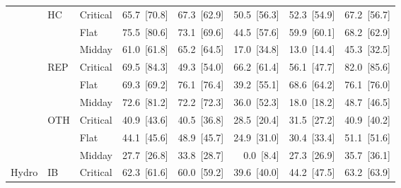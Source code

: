 \begin{tabular}{l l l r r r r r}
 & HC & Critical & 65.7~{\color{seasoncol}\scriptsize[70.8]} & 67.3~{\color{seasoncol}\scriptsize[62.9]} & 50.5~{\color{seasoncol}\scriptsize[56.3]} & 52.3~{\color{seasoncol}\scriptsize[54.9]} & 67.2~{\color{seasoncol}\scriptsize[56.7]} \\
 &  & Flat & 75.5~{\color{seasoncol}\scriptsize[80.6]} & 73.1~{\color{seasoncol}\scriptsize[69.6]} & 44.5~{\color{seasoncol}\scriptsize[57.6]} & 59.9~{\color{seasoncol}\scriptsize[60.1]} & 68.2~{\color{seasoncol}\scriptsize[62.9]} \\
 &  & Midday & 61.0~{\color{seasoncol}\scriptsize[61.8]} & 65.2~{\color{seasoncol}\scriptsize[64.5]} & 17.0~{\color{seasoncol}\scriptsize[34.8]} & 13.0~{\color{seasoncol}\scriptsize[14.4]} & 45.3~{\color{seasoncol}\scriptsize[32.5]} \\
 & REP & Critical & 69.5~{\color{seasoncol}\scriptsize[84.3]} & 49.3~{\color{seasoncol}\scriptsize[54.0]} & 66.2~{\color{seasoncol}\scriptsize[61.4]} & 56.1~{\color{seasoncol}\scriptsize[47.7]} & 82.0~{\color{seasoncol}\scriptsize[85.6]} \\
 &  & Flat & 69.3~{\color{seasoncol}\scriptsize[69.2]} & 76.1~{\color{seasoncol}\scriptsize[76.4]} & 39.2~{\color{seasoncol}\scriptsize[55.1]} & 68.6~{\color{seasoncol}\scriptsize[64.2]} & 76.1~{\color{seasoncol}\scriptsize[76.0]} \\
 &  & Midday & 72.6~{\color{seasoncol}\scriptsize[81.2]} & 72.2~{\color{seasoncol}\scriptsize[72.3]} & 36.0~{\color{seasoncol}\scriptsize[52.3]} & 18.0~{\color{seasoncol}\scriptsize[18.2]} & 48.7~{\color{seasoncol}\scriptsize[46.5]} \\
 & OTH & Critical & 40.9~{\color{seasoncol}\scriptsize[43.6]} & 40.5~{\color{seasoncol}\scriptsize[36.8]} & 28.5~{\color{seasoncol}\scriptsize[20.4]} & 31.5~{\color{seasoncol}\scriptsize[27.2]} & 40.9~{\color{seasoncol}\scriptsize[40.2]} \\
 &  & Flat & 44.1~{\color{seasoncol}\scriptsize[45.6]} & 48.9~{\color{seasoncol}\scriptsize[45.7]} & 24.9~{\color{seasoncol}\scriptsize[31.0]} & 30.4~{\color{seasoncol}\scriptsize[33.4]} & 51.1~{\color{seasoncol}\scriptsize[51.6]} \\
 &  & Midday & 27.7~{\color{seasoncol}\scriptsize[26.8]} & 33.8~{\color{seasoncol}\scriptsize[28.7]} & 0.0~{\color{seasoncol}\scriptsize[8.4]} & 27.3~{\color{seasoncol}\scriptsize[26.9]} & 35.7~{\color{seasoncol}\scriptsize[36.1]} \\
\addlinespace
Hydro & IB & Critical & 62.3~{\color{seasoncol}\scriptsize[61.6]} & 60.0~{\color{seasoncol}\scriptsize[59.2]} & 39.6~{\color{seasoncol}\scriptsize[40.0]} & 44.2~{\color{seasoncol}\scriptsize[47.5]} & 63.2~{\color{seasoncol}\scriptsize[63.9]} \\

\end{tabular}
